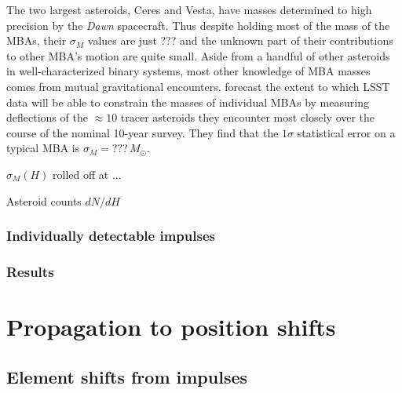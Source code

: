 \documentclass[linenumbers, onecolumn]{aastex631}
\begin{document}
The two largest asteroids, Ceres and Vesta, have masses determined to
high precision by the \textit{Dawn} spacecraft.  Thus despite holding
most of the mass of the MBAs, their $\sigma_M$ values are just ??? and
the unknown part of their contributions to other MBA's motion are
quite small.  Aside from a handful of other asteroids in
well-characterized binary systems, most other knowledge of MBA masses
comes from mutual gravitational encounters.
\citet{negin} forecast the extent to which LSST data will be able to
constrain the masses of individual MBAs by measuring deflections of
the $\approx 10$ tracer asteroids they encounter most closely over the
course of the nominal 10-year survey.  They find that the $1\sigma$
statistical error on a typical MBA is $\sigma_M=???\, M_\odot.$

$\sigma_M(H)$ rolled off at ...

Asteroid counts $dN/dH$

\subsubsection{Individually detectable impulses}

\subsubsection{Results}


\section{Propagation to position shifts}
\label{sec:propagation}

\subsection{Element shifts from impulses}
\label{sec:elements}
\end{document}
